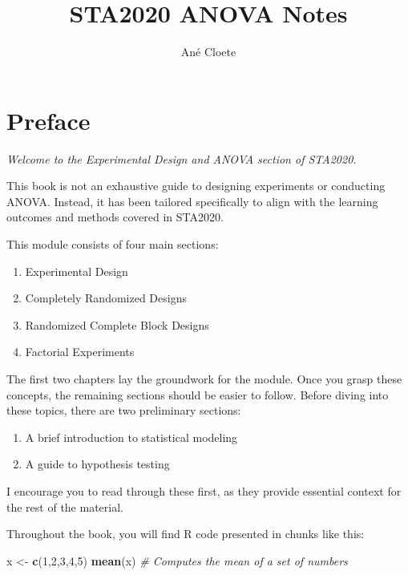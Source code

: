 \documentclass[
  letterpaper,
]{book}
\title{STA2020 ANOVA Notes}
\author{Ané Cloete}
\date{}
\newenvironment{Shaded}{\begin{snugshade}}{\end{snugshade}}
\newcommand{\CommentTok}[1]{\textcolor[rgb]{0.56,0.35,0.01}{\textit{#1}}}
\newcommand{\DecValTok}[1]{\textcolor[rgb]{0.00,0.00,0.81}{#1}}
\newcommand{\FunctionTok}[1]{\textcolor[rgb]{0.13,0.29,0.53}{\textbf{#1}}}
\newcommand{\NormalTok}[1]{#1}
\newcommand{\OtherTok}[1]{\textcolor[rgb]{0.56,0.35,0.01}{#1}}
\providecommand{\tightlist}{%
  \setlength{\itemsep}{0pt}\setlength{\parskip}{0pt}}\usepackage{longtable,booktabs,array}
\renewcommand*\contentsname{Table of contents}
\newcommand\contentsname{Table of contents}
\begin{document}
\frontmatter
\maketitle

\renewcommand*\contentsname{Table of contents}
{
\setcounter{tocdepth}{2}
\tableofcontents
}

\mainmatter
{}

\chapter*{Preface}\label{preface}


\emph{Welcome to the Experimental Design and ANOVA section of STA2020.}

This book is not an exhaustive guide to designing experiments or
conducting ANOVA. Instead, it has been tailored specifically to align
with the learning outcomes and methods covered in STA2020.

This module consists of four main sections:

\begin{enumerate}
\def\labelenumi{\arabic{enumi}.}
\tightlist
\item
  Experimental Design
\item
  Completely Randomized Designs
\item
  Randomized Complete Block Designs
\item
  Factorial Experiments
\end{enumerate}

The first two chapters lay the groundwork for the module. Once you grasp
these concepts, the remaining sections should be easier to follow.
Before diving into these topics, there are two preliminary sections:

\begin{enumerate}
\def\labelenumi{\arabic{enumi}.}
\tightlist
\item
  A brief introduction to statistical modeling
\item
  A guide to hypothesis testing
\end{enumerate}

I encourage you to read through these first, as they provide essential
context for the rest of the material.

Throughout the book, you will find R code presented in chunks like this:

\begin{Shaded}
\begin{Highlighting}[]
\NormalTok{x }\OtherTok{\textless{}{-}} \FunctionTok{c}\NormalTok{(}\DecValTok{1}\NormalTok{,}\DecValTok{2}\NormalTok{,}\DecValTok{3}\NormalTok{,}\DecValTok{4}\NormalTok{,}\DecValTok{5}\NormalTok{)}
\FunctionTok{mean}\NormalTok{(x) }\CommentTok{\# Computes the mean of a set of numbers  }
\end{Highlighting}
\end{Shaded}
\end{document}
